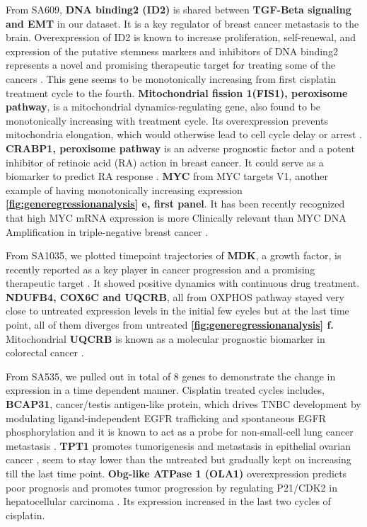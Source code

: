  From SA609, \textbf{ DNA binding2 (ID2)} is shared between \textbf{TGF-Beta signaling and EMT} in our dataset. It is a key regulator of breast cancer metastasis to the brain. Overexpression of ID2 is known to increase proliferation, self-renewal, and expression of the putative stemness markers and inhibitors of DNA binding2 represents a novel and promising therapeutic target for treating some of the cancers \cite{bae2017inhibitor, kijewska2019using}. This gene seems to be monotonically increasing from first cisplatin treatment cycle to the fourth. \textbf{Mitochondrial fission 1(FIS1), peroxisome pathway}, is a mitochondrial dynamics-regulating gene, also found to be monotonically increasing with treatment cycle. Its overexpression prevents mitochondria elongation, which would otherwise lead to cell cycle delay or arrest \cite{fan2015mir, anderson2018dysregulation}. \textbf{CRABP1, peroxisome pathway} is an adverse prognostic factor and a potent inhibitor of retinoic acid (RA) action in breast cancer. It could serve as a biomarker to predict RA response \cite{liu2015crabp1}. \textbf{MYC} from MYC targets V1, another example of having monotonically increasing expression \textbf{\autoref{fig:generegressionanalysis} e, first panel}. It has been recently recognized that high MYC mRNA expression is more Clinically relevant than MYC DNA Amplification in triple-negative breast cancer \cite{chen2008myc, katsuta2020high}.

From SA1035, we plotted timepoint trajectories of \textbf{MDK}, a growth factor, is recently reported as a key player in cancer progression and a promising therapeutic target \cite{filippou2020midkine}. It showed positive dynamics with continuous drug treatment. 
\textbf{NDUFB4, COX6C and UQCRB}, all from \ac{OXPHOS} pathway stayed very close to untreated expression levels in the initial few cycles but at the last time point, all of them diverges from untreated \textbf{\autoref{fig:generegressionanalysis} f.} Mitochondrial \textbf{UQCRB} is known as a molecular prognostic biomarker in colorectal cancer \cite{kim2017mitochondrial}.

From SA535, we pulled out in total of 8 genes to demonstrate the change in expression in a time dependent manner. Cisplatin treated cycles includes, \textbf{BCAP31}, cancer/testis antigen-like protein, which drives TNBC development by modulating ligand-independent EGFR trafficking and spontaneous EGFR phosphorylation and it is known to act as a probe for non-small-cell lung cancer metastasis
\cite{fu2019bcap31, wang2020bcap31}. \textbf{TPT1} promotes tumorigenesis and metastasis in epithelial ovarian cancer \cite{wu2019lncrna}, seem to stay lower than the untreated but gradually kept on increasing till the last time point. \textbf{Obg-like ATPase 1 (OLA1)} overexpression predicts poor prognosis and promotes tumor progression by regulating P21/CDK2 in hepatocellular carcinoma \cite{huang2020obg}. Its expression increased in the last two cycles of cisplatin. 








